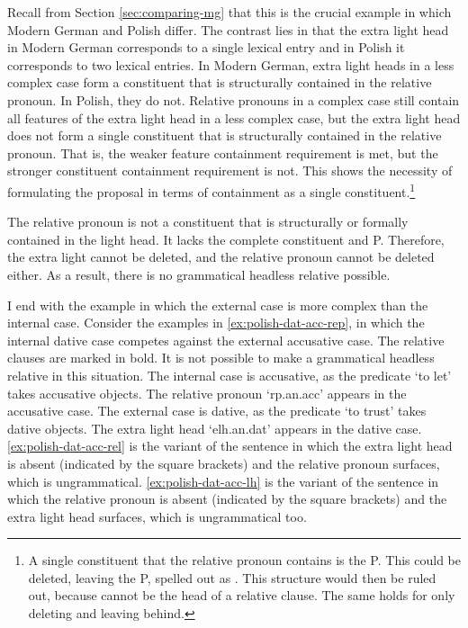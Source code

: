 Recall from Section \ref{sec:comparing-mg} that this is the crucial example in which Modern German and Polish differ. The contrast lies in that the extra light head in Modern German corresponds to a single lexical entry and in Polish it corresponds to two lexical entries.
In Modern German, extra light heads in a less complex case form a constituent that is structurally contained in the relative pronoun.
In Polish, they do not.
Relative pronouns in a complex case still contain all features of the extra light head in a less complex case, but the extra light head does not form a single constituent that is structurally contained in the relative pronoun. That is, the weaker feature containment requirement is met, but the stronger constituent containment requirement is not. This shows the necessity of formulating the proposal in terms of containment as a single constituent.\footnote{
A single constituent that the relative pronoun contains is the P. This could be deleted, leaving the P, spelled out as . This structure would then be ruled out, because  cannot be the head of a relative clause. The same holds for only deleting  and leaving  behind.
}

The relative pronoun is not a constituent that is structurally or formally contained in the light head. It lacks the complete constituent and P.
Therefore, the extra light cannot be deleted, and the relative pronoun cannot be deleted either.
As a result, there is no grammatical headless relative possible.

I end with the example in which the external case is more complex than the internal case.
Consider the examples in \ref{ex:polish-dat-acc-rep}, in which the internal dative case competes against the external accusative case. The relative clauses are marked in bold. It is not possible to make a grammatical headless relative in this situation.
The internal case is accusative, as the predicate  `to let' takes accusative objects. The relative pronoun  `\ac{rp}.\ac{an}.\ac{acc}' appears in the accusative case.
The external case is dative, as the predicate  `to trust' takes dative objects. The extra light head  `\ac{elh}.\ac{an}.\ac{dat}' appears in the dative case.
\ref{ex:polish-dat-acc-rel} is the variant of the sentence in which the extra light head is absent (indicated by the square brackets) and the relative pronoun surfaces, which is ungrammatical.
\ref{ex:polish-dat-acc-lh} is the variant of the sentence in which the relative pronoun is absent (indicated by the square brackets) and the extra light head surfaces, which is ungrammatical too.

